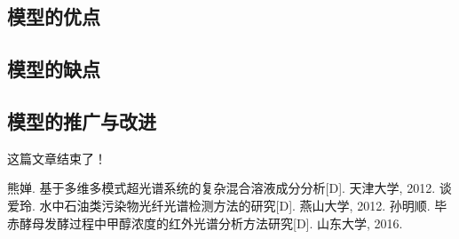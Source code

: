 \documentclass[UTF8]{ctexart}
\begin{document}
\subsection{模型的优点}
\subsection{ 模型的缺点}
\subsection{模型的推广与改进}
这篇文章结束了！

\newpage
% 
\begin{thebibliography}{9} %
	熊婵. 基于多维多模式超光谱系统的复杂混合溶液成分分析[D]. 天津大学, 2012.
    谈爱玲. 水中石油类污染物光纤光谱检测方法的研究[D]. 燕山大学, 2012.
	孙明顺. 毕赤酵母发酵过程中甲醇浓度的红外光谱分析方法研究[D]. 山东大学, 2016.
\end{thebibliography}
\end{document}
